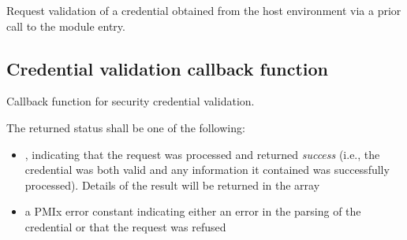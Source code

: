 \optattrend

\descr

Request validation of a credential obtained from the host environment via a prior call to the  module entry.


\subsection{Credential validation callback function}

\summary

Callback function for security credential validation.

\format


\begin{arglist}
\end{arglist}

The returned status shall be one of the following:

\begin{itemize}
    \item {}, indicating that the request was processed and returned \textit{success} (i.e., the credential was both valid and any information it contained was successfully processed). Details of the result will be returned in the  array
    \item a PMIx error constant indicating either an error in the parsing of the credential or that the request was refused
\end{itemize}

